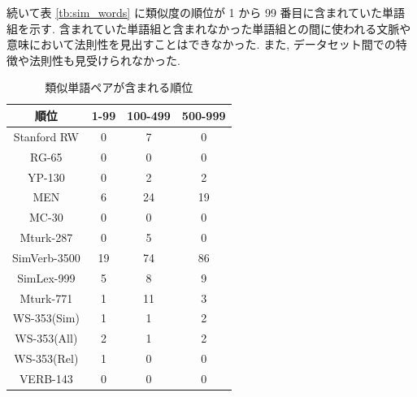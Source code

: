 \documentclass[twocolumn]{jarticle}     %
\begin{document}
続いて表 \ref{tb:sim_words} に類似度の順位が 1 から 99 番目に含まれていた単語組を示す. 
含まれていた単語組と含まれなかった単語組との間に使われる文脈や意味において法則性を見出すことはできなかった. 
また, データセット間での特徴や法則性も見受けられなかった. 

\begin{table}[th]
  \caption{類似単語ペアが含まれる順位}
  \label{tb:result}
  \begin{tabular}{c|ccc}
    \hline
    順位           & 1-99 & 100-499 & 500-999 \\ \hline \hline
    Stanford RW  & 0    & 7       & 0       \\
    RG-65        & 0    & 0       & 0       \\
    YP-130       & 0    & 2       & 2       \\
    MEN          & 6    & 24      & 19      \\
    MC-30        & 0    & 0       & 0       \\
    Mturk-287    & 0    & 5       & 0       \\
    SimVerb-3500 & 19   & 74      & 86      \\
    SimLex-999   & 5    & 8       & 9       \\
    Mturk-771    & 1    & 11      & 3       \\
    WS-353(Sim)  & 1    & 1       & 2       \\
    WS-353(All)  & 2    & 1       & 2       \\
    WS-353(Rel)  & 1    & 0       & 0       \\
    VERB-143     & 0    & 0       & 0       \\ \hline
  \end{tabular}
\end{table}
\end{document}
